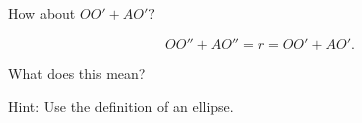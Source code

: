 




How about $OO' + AO'?$

















$$OO'' + AO'' = r = OO' + AO'.$$

What does this mean?

Hint: Use the definition of an ellipse.

